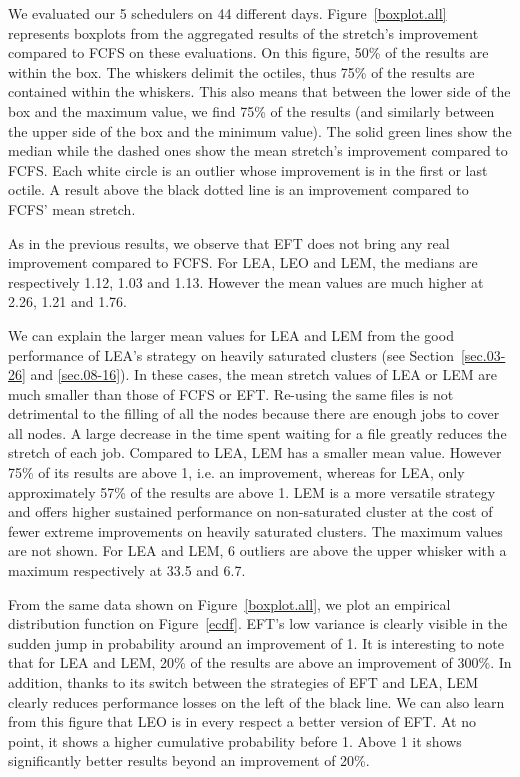 \documentclass[conference,10pt]{IEEEtran}
\begin{document}
We evaluated our 5 schedulers on 44 different days.
Figure~\ref{boxplot.all} represents boxplots from the aggregated
results of the stretch's improvement compared to FCFS on these evaluations.
On this figure, 50\% of the results are within the box.
The whiskers delimit the octiles, thus 75\% of the results are contained
within the whiskers. This also means that between the lower side of the box and the maximum value,
we find 75\% of the results (and similarly between the upper side of the box and the minimum value).
The solid green lines show the median while the dashed ones show the mean stretch's improvement compared to FCFS. 
Each white circle is an outlier whose improvement is in the first or last octile.
A result above the black dotted line is an improvement compared to FCFS' mean stretch.

As in the previous results, we observe that EFT does not bring any real improvement compared to FCFS.
For LEA, LEO and LEM, the medians are respectively 1.12, 1.03 and 1.13. 
However the mean values are much higher at 2.26, 1.21 and 1.76.

We can explain the larger mean values for LEA and LEM from the good performance of LEA's strategy
on heavily saturated clusters (see Section~\ref{sec.03-26} and \ref{sec.08-16}).
In these cases, the mean stretch values of LEA or LEM are much smaller than those of FCFS or EFT.
Re-using the same files is not detrimental to the filling of all the nodes because there are 
enough jobs to cover all nodes.
A large decrease in the time spent waiting for a file greatly reduces the stretch of each job.
Compared to LEA, LEM has a smaller mean value.
However 75\% of its results are above 1, i.e. an improvement, whereas for LEA, only approximately 57\% of the results are above 1. 
LEM is a more versatile strategy and offers higher sustained performance on non-saturated cluster at the cost
of fewer extreme improvements on heavily saturated clusters.
The maximum values are not shown. For LEA and LEM, 6 outliers are above the upper whisker with 
a maximum respectively at 33.5 and 6.7.

From the same data shown on Figure~\ref{boxplot.all}, we plot an empirical distribution function on Figure~\ref{ecdf}.
EFT's low variance is clearly visible in the sudden jump in probability around an improvement of 1.
It is interesting to note that for LEA and LEM, 20\% of the results are above an improvement of 300\%.
In addition, thanks to its switch between the strategies of EFT and LEA, LEM clearly reduces
performance losses on the left of the black line.
We can also learn from this figure that LEO is in every respect a better version of EFT.
At no point, it shows a higher cumulative probability before 1. Above 1 it shows significantly better
results beyond an improvement of 20\%.
\end{document}
